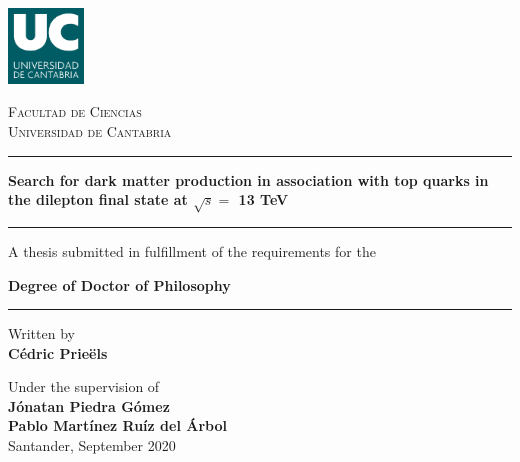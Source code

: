 \documentclass[a4paper, 10pt, openright]{report}
\begin{document}
\renewcommand{\listfigurename}{List of figures} 
\renewcommand{\listtablename}{List of tables}
\renewcommand{\floatpagefraction}{.95}%


\setlength{\parfillskip}{0pt plus\dimexpr\textwidth-2\parindent}

\doublespacing
{}\baselineskip
\setlength{\parindent}{0pt}	

\renewcommand{\arraystretch}{1.5}

\begin{titlepage}

	\centering
	\includegraphics[width=0.15\textwidth]{figs/image_UC.png}\par
	{\scshape\LARGE Facultad de Ciencias \\ \vspace{-15pt} Universidad de Cantabria \par}
	
	\vspace{0.8cm}
	
	\noindent\rule{15cm}{0.4pt}\par 
	{\huge\bfseries Search for dark matter production in association with top quarks in the dilepton final state at $\sqrt{s} = $ 13 TeV\par \vspace{10pt}}
	\noindent\rule{15cm}{0.4pt}\par 
	
	{\vspace{20pt} \Large A thesis submitted in fulfillment of the requirements for the \par \LARGE \textbf{Degree of Doctor of Philosophy} \vspace{20pt} \par \noindent\rule{15cm}{0.4pt}}
	
	\vspace{0.8cm}
	{\Large Written by \\ \textbf{C\'{e}dric Prie\"{e}ls}\par}
	\vspace{0.5cm}
	{\Large Under the supervision of \\ \textbf{J\'{o}natan Piedra G\'{o}mez} \\
	\vspace{-10pt}
	\textbf{Pablo Mart\'{i}nez Ru\'{i}z del \'{A}rbol}\\}
	\vspace{2.6cm}
	{\Large Santander, September 2020}
	\vfill

\end{titlepage}
\end{document}
